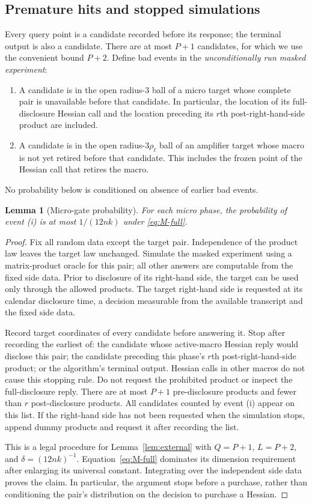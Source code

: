 \documentclass[11pt]{article}
\newtheorem{lemma}[theorem]{Lemma}
\theoremstyle{definition}
\theoremstyle{remark}
\begin{document}
\subsection{Premature hits and stopped simulations}
Every query point is a candidate recorded before its response; the terminal output is also a candidate. There are at most $P+1$ candidates, for which we use the convenient bound $P+2$. Define bad events in the \emph{unconditionally run masked experiment}:
\begin{enumerate}[label=(\roman*),leftmargin=*]
\item A candidate is in the open radius-$3$ ball of a micro target whose complete pair is unavailable before that candidate. In particular, the location of its full-disclosure Hessian call and the location preceding its $r$th post-right-hand-side product are included.
\item A candidate is in the open radius-$3\rho_\ell$ ball of an amplifier target whose macro is not yet retired before that candidate. This includes the frozen point of the Hessian call that retires the macro.
\end{enumerate}
No probability below is conditioned on absence of earlier bad events.

\begin{lemma}[Micro-gate probability]\label{lem:microprob}
For each micro phase, the probability of event (i) is at most $1/(12nk)$ under \eqref{eq:M-full}.
\end{lemma}
\begin{proof}
Fix all random data except the target pair. Independence of the product law leaves the target law unchanged. Simulate the masked experiment using a matrix-product oracle for this pair; all other answers are computable from the fixed side data. Prior to disclosure of its right-hand side, the target can be used only through the allowed products. The target right-hand side is requested at its calendar disclosure time, a decision measurable from the available transcript and the fixed side data.

Record target coordinates of every candidate before answering it. Stop after recording the earliest of: the candidate whose active-macro Hessian reply would disclose this pair; the candidate preceding this phase's $r$th post-right-hand-side product; or the algorithm's terminal output. Hessian calls in other macros do not cause this stopping rule. Do not request the prohibited product or inspect the full-disclosure reply. There are at most $P+1$ pre-disclosure products and fewer than $r$ post-disclosure products. All candidates counted by event (i) appear on this list. If the right-hand side has not been requested when the simulation stops, append dummy products and request it after recording the list.

This is a legal procedure for Lemma~\ref{lem:external} with $Q=P+1$, $L=P+2$, and $\delta=(12nk)^{-1}$. Equation~\eqref{eq:M-full} dominates its dimension requirement after enlarging its universal constant. Integrating over the independent side data proves the claim. In particular, the argument stops before a purchase, rather than conditioning the pair's distribution on the decision to purchase a Hessian.
\end{proof}
\end{document}
